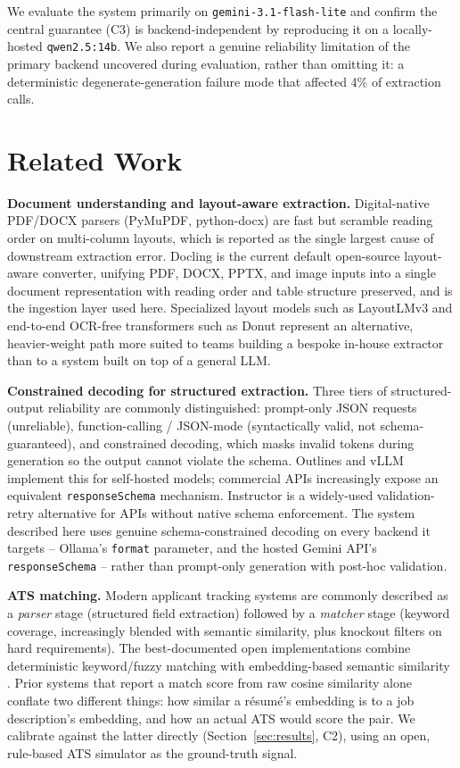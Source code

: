 \documentclass{article}
\begin{document}
We evaluate the system primarily on \texttt{gemini-3.1-flash-lite} and confirm the central
guarantee (C3) is backend-independent by reproducing it on a locally-hosted \texttt{qwen2.5:14b}.
We also report a genuine reliability limitation of the primary backend uncovered during
evaluation, rather than omitting it: a deterministic degenerate-generation failure mode that
affected 4\% of extraction calls.

\section{Related Work}

\textbf{Document understanding and layout-aware extraction.} Digital-native PDF/DOCX parsers
(PyMuPDF, python-docx) are fast but scramble reading order on multi-column layouts, which is
reported as the single largest cause of downstream extraction error. Docling
\citep{docling2024} is the current default open-source layout-aware converter, unifying PDF, DOCX,
PPTX, and image inputs into a single document representation with reading order and table
structure preserved, and is the ingestion layer used here. Specialized layout models such as
LayoutLMv3 \citep{layoutlmv3} and end-to-end OCR-free transformers such as Donut
\citep{donut2022} represent an alternative, heavier-weight path more suited to teams building a
bespoke in-house extractor than to a system built on top of a general LLM.

\textbf{Constrained decoding for structured extraction.} Three tiers of structured-output
reliability are commonly distinguished: prompt-only JSON requests (unreliable), function-calling
/ JSON-mode (syntactically valid, not schema-guaranteed), and constrained decoding, which masks
invalid tokens during generation so the output cannot violate the schema. Outlines
\citep{outlines2024} and vLLM \citep{vllm2023} implement this for self-hosted models; commercial
APIs increasingly expose an equivalent \texttt{responseSchema} mechanism. Instructor
\citep{instructor2024} is a widely-used validation-retry alternative for APIs without native
schema enforcement. The system described here uses genuine schema-constrained decoding on every
backend it targets -- Ollama's \texttt{format} parameter, and the hosted Gemini API's
\texttt{responseSchema} -- rather than prompt-only generation with post-hoc validation.

\textbf{ATS matching.} Modern applicant tracking systems are commonly described as a
\emph{parser} stage (structured field extraction) followed by a \emph{matcher} stage (keyword
coverage, increasingly blended with semantic similarity, plus knockout filters on hard
requirements). The best-documented open implementations combine deterministic keyword/fuzzy
matching with embedding-based semantic similarity \citep{sentencetransformers}. Prior systems that
report a match score from raw cosine similarity alone conflate two different things: how similar a
résumé's embedding is to a job description's embedding, and how an actual ATS would score the
pair. We calibrate against the latter directly (Section~\ref{sec:results}, C2), using an
open, rule-based ATS simulator \citep{atsscreener} as the ground-truth signal.
\end{document}
